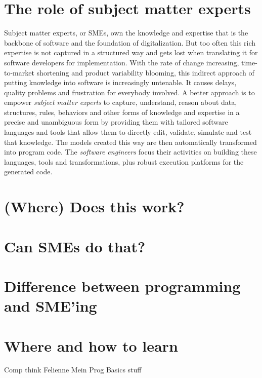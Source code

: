 \section{The role of subject matter experts}

Subject matter experts, or SMEs, own the knowledge and expertise that is the
backbone of software and the foundation of digitalization. But too often this
rich expertise is not captured in a structured way and gets lost when
translating it for software developers for implementation. With the rate of
change increasing, time-to-market shortening and product variability blooming,
this indirect approach of putting knowledge into software is increasingly
untenable. It causes delays, quality problems and frustration for everybody
involved. A better approach is to empower \emph{subject matter experts} to
capture, understand, reason about data, structures, rules, behaviors and other
forms of knowledge and expertise in a precise and unambiguous form by providing
them with tailored software languages and tools that allow them to directly
edit, validate, simulate and test that knowledge. The models created this way
are then automatically transformed into program code. The \emph{software
engineers} focus their activities on building these languages, tools and
transformations, plus robust execution platforms for the generated code.


\section{(Where) Does this work?}




\section{Can SMEs do that?}




\section{Difference between programming and SME'ing}


\section{Where and how to learn}

Comp think
Felienne
Mein Prog Basics stuff


